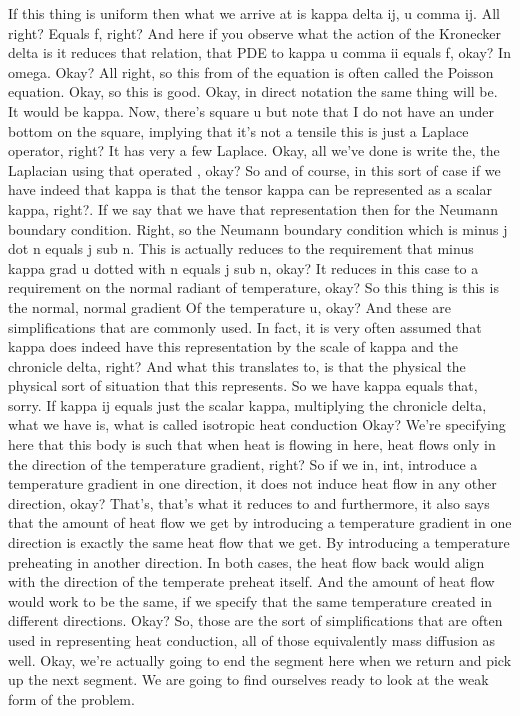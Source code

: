 \documentclass[10pt]{article}
\begin{document}
If this thing is uniform then what we arrive at is kappa delta ij, u comma ij. All right? Equals f, right? And here if you observe what the action of the Kronecker delta is it reduces that relation, that PDE to kappa u comma ii equals f, okay? In omega. Okay? All right, so this from of the equation is often called the Poisson equation. Okay, so this is good. Okay, in direct notation the same thing will be. It would be kappa. Now, there's square u but note that I do not have an under bottom on the square, implying that it's not a tensile this is just a Laplace operator, right? It has very a few  Laplace. Okay, all we've done is write the, the Laplacian using that operated , okay? So and of course, in this sort of case if we have indeed that kappa is that the tensor kappa can be represented as a scalar kappa, right?. If we say that we have that representation then for the Neumann boundary condition. Right, so the Neumann boundary condition which is minus j dot n equals j sub n. This is actually reduces to the requirement that minus kappa grad u dotted with n equals j sub n, okay? It reduces in this case to a requirement on the normal radiant of temperature, okay? So this thing is this is the normal, normal gradient Of the temperature u, okay? And these are simplifications that are commonly used. In fact, it is very often assumed that kappa does indeed have this representation by the scale of kappa and the chronicle delta, right? And what this translates to, is that the physical the physical sort of situation that this represents. So we have kappa equals that, sorry. If kappa ij equals just the scalar kappa, multiplying the chronicle delta, what we have is, what is called isotropic heat conduction Okay? We're specifying here that this body is such that when heat is flowing in here, heat flows only in the direction of the temperature gradient, right? So if we in, int, introduce a temperature gradient in one direction, it does not induce heat flow in any other direction, okay? That's, that's what it reduces to and furthermore, it also says that the amount of heat flow we get by introducing a temperature gradient in one direction is exactly the same heat flow that we get. By introducing a temperature preheating in another direction. In both cases, the heat flow back would align with the direction of the temperate preheat itself. And the amount of heat flow would work to be the same, if we specify that the same temperature created in different directions. Okay? So, those are the sort of simplifications that are often used in representing heat conduction, all of those equivalently mass diffusion as well. Okay, we're actually going to end the segment here when we return and pick up the next segment. We are going to find ourselves ready to look at the weak form of the problem.
\end{document}

